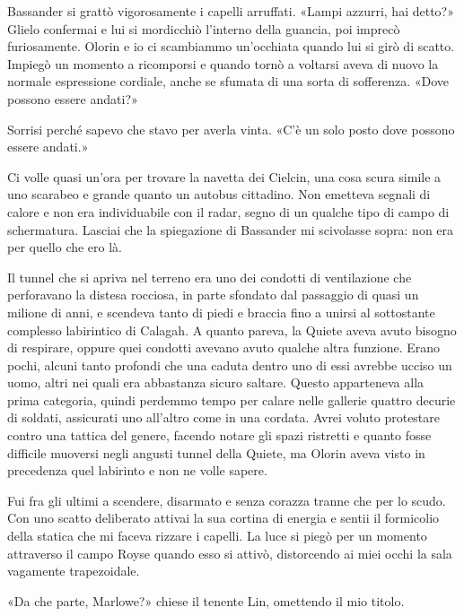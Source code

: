 Bassander si grattò vigorosamente i capelli arruffati. «Lampi azzurri,
hai detto?» Glielo confermai e lui si mordicchiò l'interno della
guancia, poi imprecò furiosamente. Olorin e io ci scambiammo un'occhiata
quando lui si girò di scatto. Impiegò un momento a ricomporsi e quando
tornò a voltarsi aveva di nuovo la normale espressione cordiale, anche
se sfumata di una sorta di sofferenza. «Dove possono essere andati?»

Sorrisi perché sapevo che stavo per averla vinta. «C'è un solo posto
dove possono essere andati.»

\begin{figure}
	\centering
	\def\svgwidth{\columnwidth}
	\scalebox{0.2}{}
\end{figure}

Ci volle quasi un'ora per trovare la navetta dei Cielcin, una cosa scura
simile a uno scarabeo e grande quanto un autobus cittadino. Non emetteva
segnali di calore e non era individuabile con il radar, segno di un
qualche tipo di campo di schermatura. Lasciai che la spiegazione di
Bassander mi scivolasse sopra: non era per quello che ero là.

Il tunnel che si apriva nel terreno era uno dei condotti di ventilazione
che perforavano la distesa rocciosa, in parte sfondato dal passaggio di
quasi un milione di anni, e scendeva tanto di piedi e braccia fino a
unirsi al sottostante complesso labirintico di Calagah. A quanto pareva,
la Quiete aveva avuto bisogno di respirare, oppure quei condotti avevano
avuto qualche altra funzione. Erano pochi, alcuni tanto profondi che una
caduta dentro uno di essi avrebbe ucciso un uomo, altri nei quali era
abbastanza sicuro saltare. Questo apparteneva alla prima categoria,
quindi perdemmo tempo per calare nelle gallerie quattro decurie di
soldati, assicurati uno all'altro come in una cordata. Avrei voluto
protestare contro una tattica del genere, facendo notare gli spazi
ristretti e quanto fosse difficile muoversi negli angusti tunnel della
Quiete, ma Olorin aveva visto in precedenza quel labirinto e non ne
volle sapere.

Fui fra gli ultimi a scendere, disarmato e senza corazza tranne che per
lo scudo. Con uno scatto deliberato attivai la sua cortina di energia e
sentii il formicolio della statica che mi faceva rizzare i capelli. La
luce si piegò per un momento attraverso il campo Royse quando esso si
attivò, distorcendo ai miei occhi la sala vagamente trapezoidale.

«Da che parte, Marlowe?» chiese il tenente Lin, omettendo il mio titolo.

